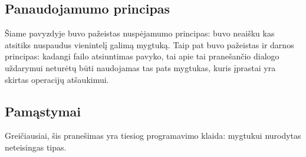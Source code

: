 \subsection{Panaudojamumo principas}

Šiame pavyzdyje buvo pažeistas nuspėjamumo principas: buvo neaišku kas
atsitiks nuspaudus vienintelį galimą mygtuką. Taip pat buvo pažeistas
ir darnos principas: kadangi failo atsiuntimas pavyko, tai apie tai
pranešančio dialogo uždarymui neturėtų būti naudojamas tas pats
mygtukas, kuris įprastai yra skirtas operacijų atšaukimui.

\subsection{Pamąstymai}

Greičiausiai, šis pranešimas yra tiesiog programavimo klaida: mygtukui
nurodytas neteisingas tipas.
